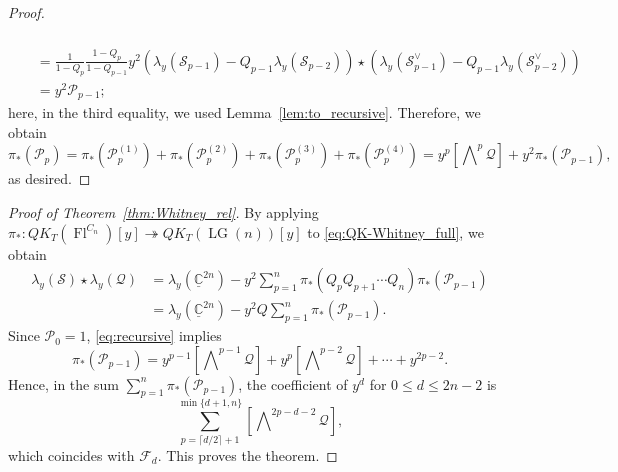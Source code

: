 \documentclass[a4paper, 11pt, reqno]{amsart}
\numberwithin{equation}{section}
\newcommand{\BC}{\mathbb{C}}
\newcommand{\udBC}{\underline{\BC}}
\newcommand{\CF}{\mathcal{F}}
\newcommand{\CP}{\mathcal{P}}
\newcommand{\CQ}{\mathcal{Q}}
\newcommand{\CS}{\mathcal{S}}
\newcommand{\LG}{\operatorname{LG}}
\newcommand{\FlC}[1]{\operatorname{Fl}^{C_{#1}}}
\newcommand{\class}[1]{\left[ #1 \right]}
\newcommand{\extprod}{\bigwedge\nolimits}
\theoremstyle{plain}
\theoremstyle{definition}
\theoremstyle{remark}
\begin{document}
\begin{proof}
\begin{align}
\begin{split}
\end{split} \\ 
&= \frac{1}{1-Q_{p}} \frac{1-Q_{p}}{1-Q_{p-1}} y^{2} (\lambda_{y}(\CS_{p-1}) - Q_{p-1}\lambda_{y}(\CS_{p-2})) \star (\lambda_{y}(\CS_{p-1}^{\vee}) - Q_{p-1} \lambda_{y}(\CS_{p-2}^{\vee})) \\ 
&= y^{2} \CP_{p-1}; 
\end{align} 
here, in the third equality, we used Lemma~\ref{lem:to_recursive}.  
Therefore, we obtain 
\begin{equation}
\pi_{\ast}(\CP_{p}) = \pi_{\ast}(\CP_{p}^{(1)}) + \pi_{\ast}(\CP_{p}^{(2)}) + \pi_{\ast}(\CP_{p}^{(3)}) + \pi_{\ast}(\CP_{p}^{(4)}) = y^{p} \class{\extprod^{p} \CQ} + y^{2}\pi_{\ast}(\CP_{p-1}), 
\end{equation}
as desired. 
\end{proof}

\begin{proof}[Proof of Theorem~\ref{thm:Whitney_rel}]
By applying $\pi_{\ast}: QK_{T}(\FlC{n})[y] \twoheadrightarrow QK_{T}(\LG(n))[y]$ to \eqref{eq:QK-Whitney_full}, we obtain 
\begin{align}
\lambda_{y}(\CS) \star \lambda_{y}(\CQ) &= \lambda_{y}(\udBC^{2n}) - y^{2} \sum_{p=1}^{n} \pi_{\ast}(Q_{p}Q_{p+1} \cdots Q_{n}) \pi_{\ast}(\CP_{p-1}) \\ 
&= \lambda_{y}(\udBC^{2n}) - y^{2} Q \sum_{p=1}^{n} \pi_{\ast}(\CP_{p-1}). 
\end{align} 
Since $\CP_{0} = 1$, \eqref{eq:recursive} implies
\begin{equation} \label{eq:pi_ast_P}
\pi_{\ast}(\CP_{p-1}) = y^{p-1} \class{\extprod^{p-1} \CQ} + y^{p} \class{\extprod^{p-2} \CQ} + \cdots + y^{2p-2}. 
\end{equation}
Hence, in the sum $\sum_{p=1}^{n} \pi_{\ast}(\CP_{p-1})$, the coefficient of $y^{d}$ for $0 \le d \le 2n-2$ is 
\begin{equation}
\sum_{p = \lceil d/2 \rceil + 1}^{\min\{d+1, n\}} \class{\extprod^{2p-d-2} \CQ}, 
\end{equation}
which coincides with $\CF_{d}$. 
This proves the theorem. 
\end{proof}
\end{document}
